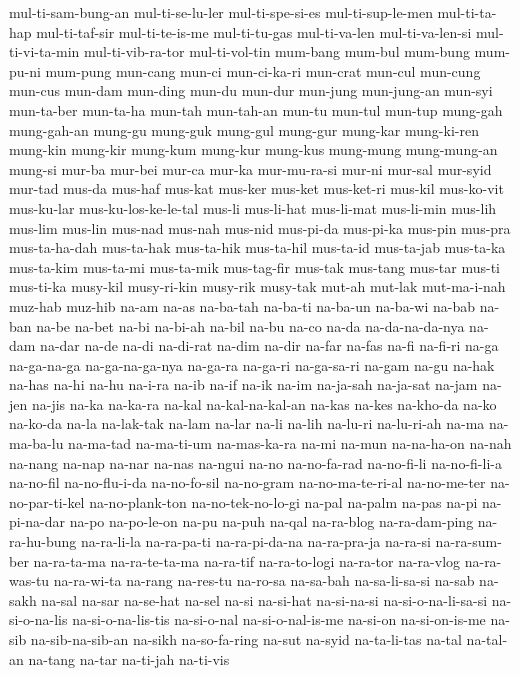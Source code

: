 {mul-ti-sam-bung-an mul-ti-se-lu-ler mul-ti-spe-si-es mul-ti-sup-le-men
mul-ti-ta-hap mul-ti-taf-sir mul-ti-te-is-me mul-ti-tu-gas mul-ti-va-len
mul-ti-va-len-si mul-ti-vi-ta-min mul-ti-vib-ra-tor mul-ti-vol-tin
mum-bang mum-bul mum-bung mum-pu-ni mum-pung mun-cang mun-ci mun-ci-ka-ri
mun-crat mun-cul mun-cung mun-cus mun-dam mun-ding mun-du mun-dur mun-jung
mun-jung-an mun-syi mun-ta-ber mun-ta-ha mun-tah mun-tah-an mun-tu mun-tul
mun-tup mung-gah mung-gah-an mung-gu mung-guk mung-gul mung-gur mung-kar
mung-ki-ren mung-kin mung-kir mung-kum mung-kur mung-kus mung-mung
mung-mung-an mung-si mur-ba mur-bei mur-ca mur-ka mur-mu-ra-si mur-ni
mur-sal mur-syid mur-tad mus-da mus-haf mus-kat mus-ker mus-ket mus-ket-ri
mus-kil mus-ko-vit mus-ku-lar mus-ku-los-ke-le-tal mus-li mus-li-hat
mus-li-mat mus-li-min mus-lih mus-lim mus-lin mus-nad mus-nah mus-nid
mus-pi-da mus-pi-ka mus-pin mus-pra mus-ta-ha-dah mus-ta-hak mus-ta-hik
mus-ta-hil mus-ta-id mus-ta-jab mus-ta-ka mus-ta-kim mus-ta-mi mus-ta-mik
mus-tag-fir mus-tak mus-tang mus-tar mus-ti mus-ti-ka musy-kil musy-ri-kin
musy-rik musy-tak mut-ah mut-lak mut-ma-i-nah muz-hab muz-hib na-am na-as
na-ba-tah na-ba-ti na-ba-un na-ba-wi na-bab na-ban na-be na-bet na-bi
na-bi-ah na-bil na-bu na-co na-da na-da-na-da-nya na-dam na-dar na-de
na-di na-di-rat na-dim na-dir na-far na-fas na-fi na-fi-ri na-ga
na-ga-na-ga na-ga-na-ga-nya na-ga-ra na-ga-ri na-ga-sa-ri na-gam na-gu
na-hak na-has na-hi na-hu na-i-ra na-ib na-if na-ik na-im na-ja-sah
na-ja-sat na-jam na-jen na-jis na-ka na-ka-ra na-kal na-kal-na-kal-an
na-kas na-kes na-kho-da na-ko na-ko-da na-la na-lak-tak na-lam na-lar
na-li na-lih na-lu-ri na-lu-ri-ah na-ma na-ma-ba-lu na-ma-tad na-ma-ti-um
na-mas-ka-ra na-mi na-mun na-na-ha-on na-nah na-nang na-nap na-nar na-nas
na-ngui na-no na-no-fa-rad na-no-fi-li na-no-fi-li-a na-no-fil
na-no-flu-i-da na-no-fo-sil na-no-gram na-no-ma-te-ri-al na-no-me-ter
na-no-par-ti-kel na-no-plank-ton na-no-tek-no-lo-gi na-pal na-palm na-pas
na-pi na-pi-na-dar na-po na-po-le-on na-pu na-puh na-qal na-ra-blog
na-ra-dam-ping na-ra-hu-bung na-ra-li-la na-ra-pa-ti na-ra-pi-da-na
na-ra-pra-ja na-ra-si na-ra-sum-ber na-ra-ta-ma na-ra-te-ta-ma na-ra-tif
na-ra-to-logi na-ra-tor na-ra-vlog na-ra-was-tu na-ra-wi-ta na-rang
na-res-tu na-ro-sa na-sa-bah na-sa-li-sa-si na-sab na-sakh na-sal na-sar
na-se-hat na-sel na-si na-si-hat na-si-na-si na-si-o-na-li-sa-si
na-si-o-na-lis na-si-o-na-lis-tis na-si-o-nal na-si-o-nal-is-me na-si-on
na-si-on-is-me na-sib na-sib-na-sib-an na-sikh na-so-fa-ring na-sut
na-syid na-ta-li-tas na-tal na-tal-an na-tang na-tar na-ti-jah na-ti-vis
}
